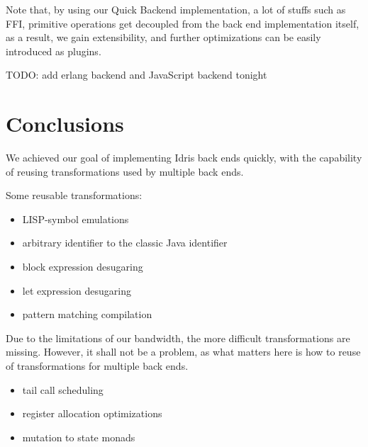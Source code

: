 \documentclass[a1,portrait]{a1poster}
\begin{document}
\begin{multicols}{2}
Note that, by using our Quick Backend implementation, a lot of stuffs
such as FFI, primitive operations get decoupled from the back end implementation itself,
as a result, we gain extensibility,
and further optimizations can be easily introduced as plugins.

TODO: add erlang backend and JavaScript backend tonight

\section*{Conclusions}

We achieved our goal of implementing Idris back ends quickly, with the capability of reusing transformations used by multiple back ends.


\begin{multicols}{2}

\begin{minipage}[t]{0.9\linewidth}
Some reusable transformations:
\begin{itemize}
    \setlength\itemsep{-0.2em}
    \item LISP-symbol emulations
    \item arbitrary identifier to the classic Java identifier
    \item block expression desugaring
    \item let expression desugaring
    \item pattern matching compilation
\end{itemize}
\end{minipage}

\begin{minipage}[t]{0.8\linewidth}
Due to the limitations of our bandwidth, the more difficult transformations are missing.
However, it shall not be a problem, as what matters here is how to reuse of transformations for multiple back ends.

\begin{itemize}
    \setlength\itemsep{-0.2em}
    \item tail call scheduling
    \item register allocation optimizations
    \item mutation to state monads
\end{itemize}
\end{minipage}

\end{multicols}

\vspace{-1cm}


\end{multicols}
\end{document}
